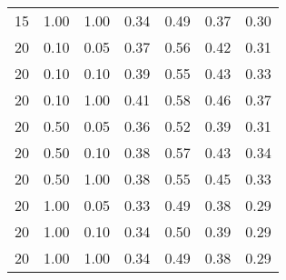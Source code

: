 \begin{tabular}{lllcccc}
15 & 1.00 & 1.00 & 0.34 & 0.49 & 0.37 & 0.30 \\ 
20 & 0.10 & 0.05 & 0.37 & 0.56 & 0.42 & 0.31 \\ 
20 & 0.10 & 0.10 & 0.39 & 0.55 & 0.43 & 0.33 \\ 
20 & 0.10 & 1.00 & 0.41 & 0.58 & 0.46 & 0.37 \\ 
20 & 0.50 & 0.05 & 0.36 & 0.52 & 0.39 & 0.31 \\ 
20 & 0.50 & 0.10 & 0.38 & 0.57 & 0.43 & 0.34 \\ 
20 & 0.50 & 1.00 & 0.38 & 0.55 & 0.45 & 0.33 \\ 
20 & 1.00 & 0.05 & 0.33 & 0.49 & 0.38 & 0.29 \\ 
20 & 1.00 & 0.10 & 0.34 & 0.50 & 0.39 & 0.29 \\ 
20 & 1.00 & 1.00 & 0.34 & 0.49 & 0.38 & 0.29 \\ 
\end{tabular} 
